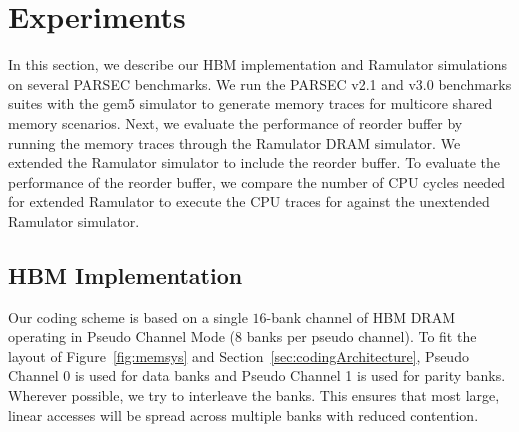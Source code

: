   \section{Experiments}
\label{sec:experiments}

In this section, we describe our HBM implementation and Ramulator simulations on several PARSEC benchmarks. We run the PARSEC v2.1 and v3.0 benchmarks suites with the gem5 simulator to generate memory traces for multicore shared memory scenarios. Next, we evaluate the performance of reorder buffer by running the memory traces through the Ramulator DRAM simulator. We extended the Ramulator simulator to include the reorder buffer. To evaluate the performance of the reorder buffer, we compare the number of CPU cycles needed for extended Ramulator to execute the CPU traces for against the unextended Ramulator simulator.

\subsection{HBM Implementation}
Our coding scheme is based on a single $16$-bank channel of HBM DRAM operating in Pseudo Channel Mode ($8$ banks per pseudo channel). To fit the layout of Figure~\ref{fig:memsys} and Section~\ref{sec:codingArchitecture}, Pseudo Channel 0 is used for data banks and Pseudo Channel 1 is used for parity banks. 
%
%
Wherever possible, we try to interleave the banks. This ensures that most large, linear accesses will be spread across multiple banks with reduced contention.

